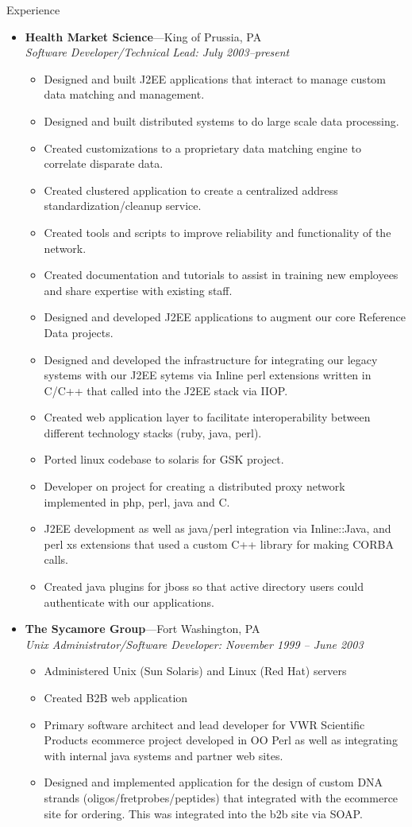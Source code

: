 \documentclass[11pt,oneside]{article}
\newenvironment{ressection}[1]{
	\vspace{4pt}
	{\fontfamily{phv}\selectfont\Large#1}
	\begin{itemize}
	\vspace{3pt}
}{
	\end{itemize}
}
\newcommand{\ressubitem}[1]{
	\vspace{-1pt}
	\item \begin{flushleft} #1 \end{flushleft}
}
\newcommand{\resbigitem}[3]{
	\vspace{-5pt}
	\item
	\textbf{#1}---#2 \\
	\textit{#3}
}
\newenvironment{ressubsec}[3]{
	\resbigitem{#1}{#2}{#3}
	\vspace{-2pt}
	\begin{itemize}
}{
	\end{itemize}
}
\begin{document}
\begin{ressection}{Experience}
	\begin{ressubsec}{Health Market Science}{King of Prussia, PA}{Software Developer/Technical Lead: July 2003--present}
		\ressubitem{Designed and built J2EE applications that interact to manage custom data matching and management.}
		\ressubitem{Designed and built distributed systems to do large scale data processing.}
		\ressubitem{Created customizations to a proprietary data matching engine to correlate disparate data.}
		\ressubitem{Created clustered application to create a centralized address standardization/cleanup service.}
		\ressubitem{Created tools and scripts to improve reliability and functionality of the network.}
		\ressubitem{Created documentation and tutorials to assist in training new employees and share expertise with existing staff.}
	        \ressubitem{Designed and developed J2EE applications to augment our core Reference Data projects.}
	        \ressubitem{Designed and developed the infrastructure for integrating our legacy systems with our J2EE sytems via Inline perl extensions written in C/C++ that called into the J2EE stack via IIOP.}
                \ressubitem{Created web application layer to facilitate interoperability between different technology stacks (ruby, java, perl).}
	        \ressubitem{Ported linux codebase to solaris for GSK project.}
	        \ressubitem{Developer on project for creating a distributed proxy network implemented in php, perl, java and C.}
	        \ressubitem{J2EE development as well as java/perl integration via Inline::Java, and perl xs extensions that used a custom C++ library for making CORBA calls.}
                \ressubitem{Created java plugins for jboss so that active directory users could authenticate with our applications.}
	\end{ressubsec}
	\begin{ressubsec}{The Sycamore Group}{Fort Washington, PA}{Unix Administrator/Software Developer: November 1999 -- June 2003}
		\ressubitem{Administered Unix (Sun Solaris) and Linux (Red Hat) servers}
		\ressubitem{Created B2B web application}
	        \ressubitem{Primary software architect and lead developer for VWR Scientific Products ecommerce project developed in OO Perl as well as integrating with internal java systems and partner web sites. }
	        \ressubitem{Designed and implemented application for the design of custom DNA strands (oligos/fretprobes/peptides) that integrated with the ecommerce site for ordering. This was integrated into the b2b site via SOAP.}

\end{ressubsec}
\end{ressection}
\end{document}
